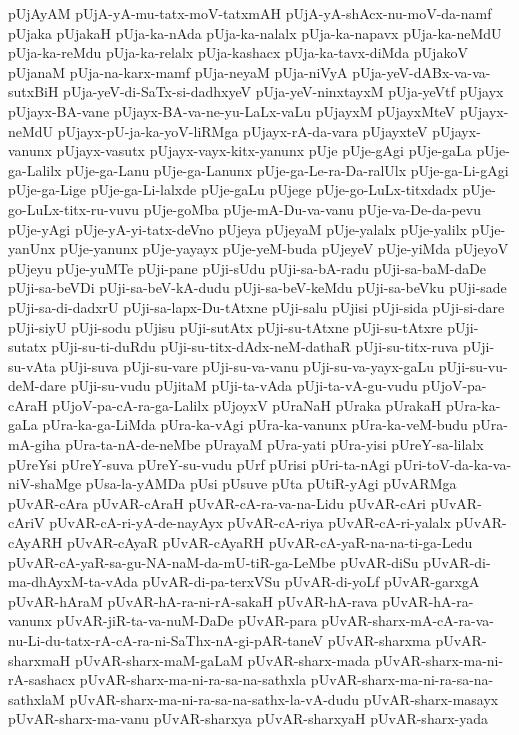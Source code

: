 {pUjAyAM
pUjA-yA-mu-tatx-moV-tatxmAH
pUjA-yA-shAcx-nu-moV-da-namf
pUjaka
pUjakaH
pUja-ka-nAda
pUja-ka-nalalx
pUja-ka-napavx
pUja-ka-neMdU
pUja-ka-reMdu
pUja-ka-relalx
pUja-kashacx
pUja-ka-tavx-diMda
pUjakoV
pUjanaM
pUja-na-karx-mamf
pUja-neyaM
pUja-niVyA
pUja-yeV-dABx-va-va-sutxBiH
pUja-yeV-di-SaTx-si-dadhxyeV
pUja-yeV-ninxtayxM
pUja-yeVtf
pUjayx
pUjayx-BA-vane
pUjayx-BA-va-ne-yu-LaLx-vaLu
pUjayxM
pUjayxMteV
pUjayx-neMdU
pUjayx-pU-ja-ka-yoV-liRMga
pUjayx-rA-da-vara
pUjayxteV
pUjayx-vanunx
pUjayx-vasutx
pUjayx-vayx-kitx-yanunx
pUje
pUje-gAgi
pUje-gaLa
pUje-ga-Lalilx
pUje-ga-Lanu
pUje-ga-Lanunx
pUje-ga-Le-ra-Da-ralUlx
pUje-ga-Li-gAgi
pUje-ga-Lige
pUje-ga-Li-lalxde
pUje-gaLu
pUjege
pUje-go-LuLx-titxdadx
pUje-go-LuLx-titx-ru-vuvu
pUje-goMba
pUje-mA-Du-va-vanu
pUje-va-De-da-pevu
pUje-yAgi
pUje-yA-yi-tatx-deVno
pUjeya
pUjeyaM
pUje-yalalx
pUje-yalilx
pUje-yanUnx
pUje-yanunx
pUje-yayayx
pUje-yeM-buda
pUjeyeV
pUje-yiMda
pUjeyoV
pUjeyu
pUje-yuMTe
pUji-pane
pUji-sUdu
pUji-sa-bA-radu
pUji-sa-baM-daDe
pUji-sa-beVDi
pUji-sa-beV-kA-dudu
pUji-sa-beV-keMdu
pUji-sa-beVku
pUji-sade
pUji-sa-di-dadxrU
pUji-sa-lapx-Du-tAtxne
pUji-salu
pUjisi
pUji-sida
pUji-si-dare
pUji-siyU
pUji-sodu
pUjisu
pUji-sutAtx
pUji-su-tAtxne
pUji-su-tAtxre
pUji-sutatx
pUji-su-ti-duRdu
pUji-su-titx-dAdx-neM-dathaR
pUji-su-titx-ruva
pUji-su-vAta
pUji-suva
pUji-su-vare
pUji-su-va-vanu
pUji-su-va-yayx-gaLu
pUji-su-vu-deM-dare
pUji-su-vudu
pUjitaM
pUji-ta-vAda
pUji-ta-vA-gu-vudu
pUjoV-pa-cAraH
pUjoV-pa-cA-ra-ga-Lalilx
pUjoyxV
pUraNaH
pUraka
pUrakaH
pUra-ka-gaLa
pUra-ka-ga-LiMda
pUra-ka-vAgi
pUra-ka-vanunx
pUra-ka-veM-budu
pUra-mA-giha
pUra-ta-nA-de-neMbe
pUrayaM
pUra-yati
pUra-yisi
pUreY-sa-lilalx
pUreYsi
pUreY-suva
pUreY-su-vudu
pUrf
pUrisi
pUri-ta-nAgi
pUri-toV-da-ka-va-niV-shaMge
pUsa-la-yAMDa
pUsi
pUsuve
pUta
pUtiR-yAgi
pUvARMga
pUvAR-cAra
pUvAR-cAraH
pUvAR-cA-ra-va-na-Lidu
pUvAR-cAri
pUvAR-cAriV
pUvAR-cA-ri-yA-de-nayAyx
pUvAR-cA-riya
pUvAR-cA-ri-yalalx
pUvAR-cAyARH
pUvAR-cAyaR
pUvAR-cAyaRH
pUvAR-cA-yaR-na-na-ti-ga-Ledu
pUvAR-cA-yaR-sa-gu-NA-naM-da-mU-tiR-ga-LeMbe
pUvAR-diSu
pUvAR-di-ma-dhAyxM-ta-vAda
pUvAR-di-pa-terxVSu
pUvAR-di-yoLf
pUvAR-garxgA
pUvAR-hAraM
pUvAR-hA-ra-ni-rA-sakaH
pUvAR-hA-rava
pUvAR-hA-ra-vanunx
pUvAR-jiR-ta-va-nuM-DaDe
pUvAR-para
pUvAR-sharx-mA-cA-ra-va-nu-Li-du-tatx-rA-cA-ra-ni-SaThx-nA-gi-pAR-taneV
pUvAR-sharxma
pUvAR-sharxmaH
pUvAR-sharx-maM-gaLaM
pUvAR-sharx-mada
pUvAR-sharx-ma-ni-rA-sashacx
pUvAR-sharx-ma-ni-ra-sa-na-sathxla
pUvAR-sharx-ma-ni-ra-sa-na-sathxlaM
pUvAR-sharx-ma-ni-ra-sa-na-sathx-la-vA-dudu
pUvAR-sharx-masayx
pUvAR-sharx-ma-vanu
pUvAR-sharxya
pUvAR-sharxyaH
pUvAR-sharx-yada
}
